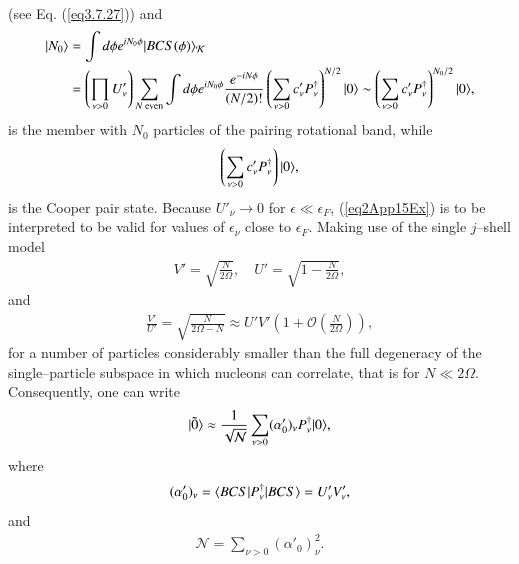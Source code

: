 \begin{subappendices}
\begin{align}
\end{align}
(see Eq. (\ref{eq3.7.27})) and
\begin{align}\label{eq2App14Ex}
\nonumber|{N_0} \rangle&=\int d\phi e^{iN_0\phi}|{BCS(\phi)} \rangle_{\mathcal K}\\
&=\left(\prod_{\nu>0}U'_\nu\right)\sum_{N \text{ even}}\int d\phi e^{iN_0\phi}\frac{e^{-iN\phi}}{(N/2)!}\left(\sum_{\nu>0}c'_\nu P_\nu^\dagger\right)^{N/2}|{0} \rangle\sim\left(\sum_{\nu>0}c'_\nu P_\nu^\dagger\right)^{N_0/2}|{0} \rangle,
\end{align}
is the member with $N_0$ particles of the pairing rotational band, while
\begin{align}\label{eq2App15Ex}
\left(\sum_{\nu>0}c'_\nu P_\nu^\dagger\right)|{0} \rangle,
\end{align}
is the Cooper pair state. Because $U'_\nu\to 0$ for $\epsilon\ll \epsilon_F$, (\ref{eq2App15Ex}) is to be interpreted to be valid for values of $\epsilon_\nu$ close to $\epsilon_F$.
Making use of the single $j$--shell model
\begin{align}\label{eq2App16Ex}
V'=\sqrt{\frac{N}{2\Omega}},\quad U'=\sqrt{1-\frac{N}{2\Omega}},
\end{align}
and
\begin{align}\label{eq2App17Ex}
\frac{V'}{U'}=\sqrt{\frac{N}{2\Omega-N}}\approx U'V'\left(1+\mathcal O\left(\frac{N}{2\Omega}\right)\right),
\end{align}
for a number of particles considerably smaller than the full degeneracy of the single--particle subspace in which nucleons can correlate, that is for $N\ll2\Omega$. Consequently, one can write
\begin{align}\label{eq2App18Ex}
|{\tilde 0} \rangle\approx\frac{1}{\sqrt{\mathcal N}}\sum_{\nu>0}(\alpha'_0)_\nu P^\dagger_\nu|{0} \rangle,
\end{align}
where
\begin{align}\label{eq2App19Ex}
(\alpha'_0)_\nu =\langle {BCS|P^\dagger_\nu|BCS} \rangle=U'_\nu V'_\nu,
\end{align}
and
\begin{align}\label{eq2App20Ex}
\mathcal N=\sum_{\nu>0}(\alpha'_0)_\nu^2.
\end{align}











\end{subappendices}















% 
%
